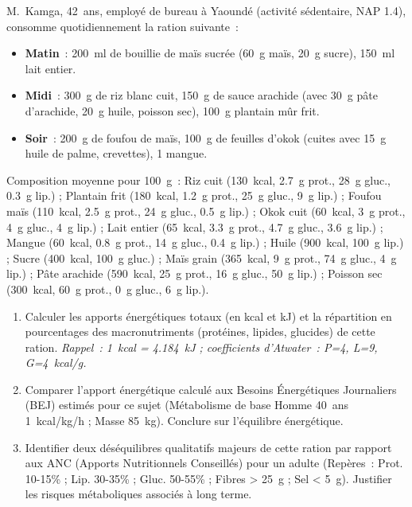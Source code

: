 \documentclass[11pt]{article}
\begin{document}
\begin{exercice}
M.~Kamga, 42~ans, employé de bureau à Yaoundé (activité sédentaire, NAP \SI{1,4}{}), consomme quotidiennement la ration suivante~:
\begin{itemize}
    \item \textbf{Matin}~: \SI{200}{ml} de bouillie de maïs sucrée (\SI{60}{g} maïs, \SI{20}{g} sucre), \SI{150}{ml} lait entier.
    \item \textbf{Midi}~: \SI{300}{g} de riz blanc cuit, \SI{150}{g} de sauce arachide (avec \SI{30}{g} pâte d'arachide, \SI{20}{g} huile, poisson sec), \SI{100}{g} plantain mûr frit.
    \item \textbf{Soir}~: \SI{200}{g} de foufou de maïs, \SI{100}{g} de feuilles d'okok (cuites avec \SI{15}{g} huile de palme, crevettes), \SI{1}{} mangue.
\end{itemize}
Composition moyenne pour \SI{100}{g}~: Riz cuit (\SI{130}{kcal}, \SI{2,7}{g} prot., \SI{28}{g} gluc., \SI{0,3}{g} lip.) ; Plantain frit (\SI{180}{kcal}, \SI{1,2}{g} prot., \SI{25}{g} gluc., \SI{9}{g} lip.) ; Foufou maïs (\SI{110}{kcal}, \SI{2,5}{g} prot., \SI{24}{g} gluc., \SI{0,5}{g} lip.) ; Okok cuit (\SI{60}{kcal}, \SI{3}{g} prot., \SI{4}{g} gluc., \SI{4}{g} lip.) ; Lait entier (\SI{65}{kcal}, \SI{3,3}{g} prot., \SI{4,7}{g} gluc., \SI{3,6}{g} lip.) ; Mangue (\SI{60}{kcal}, \SI{0,8}{g} prot., \SI{14}{g} gluc., \SI{0,4}{g} lip.) ; Huile (\SI{900}{kcal}, \SI{100}{g} lip.) ; Sucre (\SI{400}{kcal}, \SI{100}{g} gluc.) ; Maïs grain (\SI{365}{kcal}, \SI{9}{g} prot., \SI{74}{g} gluc., \SI{4}{g} lip.) ; Pâte arachide (\SI{590}{kcal}, \SI{25}{g} prot., \SI{16}{g} gluc., \SI{50}{g} lip.) ; Poisson sec (\SI{300}{kcal}, \SI{60}{g} prot., \SI{0}{g} gluc., \SI{6}{g} lip.).
\begin{enumerate}
    \item Calculer les apports énergétiques totaux (en kcal et kJ) et la répartition en pourcentages des macronutriments (protéines, lipides, glucides) de cette ration. \textit{Rappel~: 1~kcal = \SI{4,184}{kJ} ; coefficients d'Atwater~: P=4, L=9, G=4~kcal/g.}
    \item Comparer l'apport énergétique calculé aux Besoins Énergétiques Journaliers (BEJ) estimés pour ce sujet (Métabolisme de base Homme 40~ans \approx \SI{1}{kcal/kg/h} ; Masse \SI{85}{kg}). Conclure sur l'équilibre énergétique.
    \item Identifier deux déséquilibres qualitatifs majeurs de cette ration par rapport aux ANC (Apports Nutritionnels Conseillés) pour un adulte (Repères~: Prot. 10-15\% ; Lip. 30-35\% ; Gluc. 50-55\% ; Fibres > \SI{25}{g} ; Sel < \SI{5}{g}). Justifier les risques métaboliques associés à long terme.
\end{enumerate}
\end{exercice}
\end{document}
